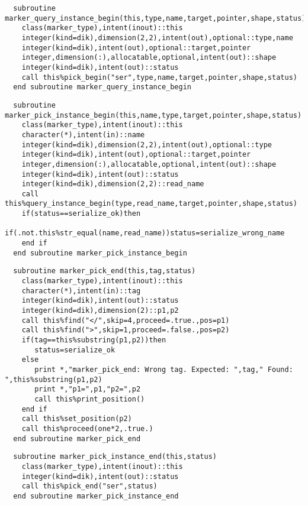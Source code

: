 \begin{Verbatim}
  subroutine marker_query_instance_begin(this,type,name,target,pointer,shape,status)
    class(marker_type),intent(inout)::this
    integer(kind=dik),dimension(2,2),intent(out),optional::type,name
    integer(kind=dik),intent(out),optional::target,pointer
    integer,dimension(:),allocatable,optional,intent(out)::shape
    integer(kind=dik),intent(out)::status
    call this%pick_begin("ser",type,name,target,pointer,shape,status)
  end subroutine marker_query_instance_begin
\end{Verbatim}

\begin{Verbatim}
  subroutine marker_pick_instance_begin(this,name,type,target,pointer,shape,status)
    class(marker_type),intent(inout)::this
    character(*),intent(in)::name
    integer(kind=dik),dimension(2,2),intent(out),optional::type
    integer(kind=dik),intent(out),optional::target,pointer
    integer,dimension(:),allocatable,optional,intent(out)::shape
    integer(kind=dik),intent(out)::status
    integer(kind=dik),dimension(2,2)::read_name
    call this%query_instance_begin(type,read_name,target,pointer,shape,status)
    if(status==serialize_ok)then
       if(.not.this%str_equal(name,read_name))status=serialize_wrong_name
    end if
  end subroutine marker_pick_instance_begin
\end{Verbatim}

\begin{Verbatim}
  subroutine marker_pick_end(this,tag,status)
    class(marker_type),intent(inout)::this
    character(*),intent(in)::tag
    integer(kind=dik),intent(out)::status
    integer(kind=dik),dimension(2)::p1,p2
    call this%find("</",skip=4,proceed=.true.,pos=p1)
    call this%find(">",skip=1,proceed=.false.,pos=p2)
    if(tag==this%substring(p1,p2))then
       status=serialize_ok
    else
       print *,"marker_pick_end: Wrong tag. Expected: ",tag," Found: ",this%substring(p1,p2)
       print *,"p1=",p1,"p2=",p2
       call this%print_position()
    end if
    call this%set_position(p2)
    call this%proceed(one*2,.true.)
  end subroutine marker_pick_end
\end{Verbatim}

\begin{Verbatim}
  subroutine marker_pick_instance_end(this,status)
    class(marker_type),intent(inout)::this
    integer(kind=dik),intent(out)::status
    call this%pick_end("ser",status)
  end subroutine marker_pick_instance_end
\end{Verbatim}

